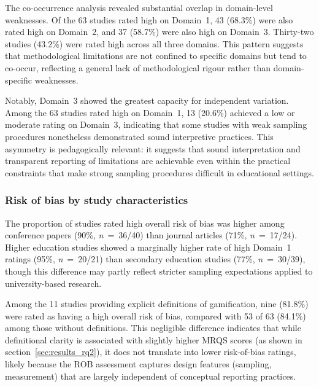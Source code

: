 \documentclass[etq]{acnsart}
\begin{document}
	The co-occurrence analysis revealed substantial overlap in domain-level weaknesses. Of the 63 studies rated high on Domain~1, 43 (68.3\%) were also rated high on Domain~2, and 37 (58.7\%) were also high on Domain~3. Thirty-two studies (43.2\%) were rated high across all three domains. This pattern suggests that methodological limitations are not confined to specific domains but tend to co-occur, reflecting a general lack of methodological rigour rather than domain-specific weaknesses.
	
	Notably, Domain~3 showed the greatest capacity for independent variation. Among the 63 studies rated high on Domain~1, 13 (20.6\%) achieved a low or moderate rating on Domain~3, indicating that some studies with weak sampling procedures nonetheless demonstrated sound interpretive practices. This asymmetry is pedagogically relevant: it suggests that sound interpretation and transparent reporting of limitations are achievable even within the practical constraints that make strong sampling procedures difficult in educational settings.
	
	\subsubsection{Risk of bias by study characteristics}
	\label{sec:results_rq3_crosstab}
	
	The proportion of studies rated high overall risk of bias was higher among conference papers (90\%, \textit{n}~=~36/40) than journal articles (71\%, \textit{n}~=~17/24). Higher education studies showed a marginally higher rate of high Domain~1 ratings (95\%, \textit{n}~=~20/21) than secondary education studies (77\%, \textit{n}~=~30/39), though this difference may partly reflect stricter sampling expectations applied to university-based research.
	
	Among the 11 studies providing explicit definitions of gamification, nine (81.8\%) were rated as having a high overall risk of bias, compared with 53 of 63 (84.1\%) among those without definitions. This negligible difference indicates that while definitional clarity is associated with slightly higher MRQS scores (as shown in section~\ref{sec:results_rq2}), it does not translate into lower risk-of-bias ratings, likely because the ROB assessment captures design features (sampling, measurement) that are largely independent of conceptual reporting practices.
	
	
	
\end{document}

